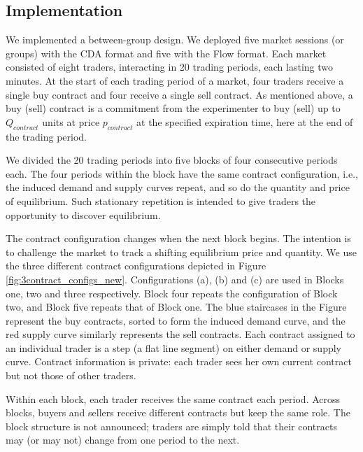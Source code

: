 \documentclass[12pt]{article}
\begin{document}
\subsection{Implementation}\label{sect:design}

We implemented a between-group design. We deployed five market sessions (or groups) with the CDA format and five with the Flow format. Each market consisted of eight traders, interacting in 20 trading periods, each lasting two minutes. 
At the start of each trading period of a market,  four traders receive a single buy contract and four receive a single sell contract. %
As mentioned above, %
a buy (sell) contract is a commitment from the experimenter to buy (sell) up to $Q_{\textit{contract}}$ units at price $p_{\textit{contract}}$ at the specified expiration time, here at the end of the trading period. %


We divided the 20 trading periods into five blocks of four consecutive periods each. 
The four periods within the block have the same contract configuration, i.e., the induced demand and supply curves repeat, and so do the quantity and price of equilibrium. 
Such stationary repetition is intended to give traders the opportunity to discover equilibrium.

The contract configuration changes when the next block begins. 
The intention is to challenge the market to track a shifting equilibrium price and quantity.
We use the three different contract configurations depicted in Figure \ref{fig:3contract_configs_new}.
Configurations (a), (b) and (c) are used in Blocks one, two and three respectively.
Block four repeats the configuration of Block two, and Block five repeats that of Block one. 
The blue staircases in the Figure represent the buy contracts, sorted to form the induced demand curve, and the red supply curve similarly represents the sell contracts. 
Each contract assigned to an individual trader is a step (a flat line segment) on either demand or supply curve. 
Contract information is private: each trader sees her own current contract but not those of other traders.

Within each block, each trader receives the same contract each period. Across blocks, buyers and sellers receive different contracts but keep the same role. The block structure is not announced; traders are simply told that their contracts may (or may not) change from one period to the next. 
\end{document}
